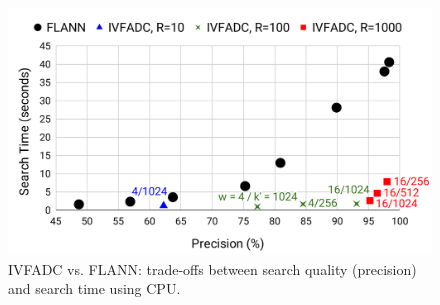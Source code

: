 %
%
\begin{figure}[htbp]
\centerline{\includegraphics[width=\columnwidth]{figs/flann.png}}
\caption{IVFADC vs. FLANN: trade-offs between search quality (precision) and search time using CPU.}
\label{fig:flann}
\end{figure}

